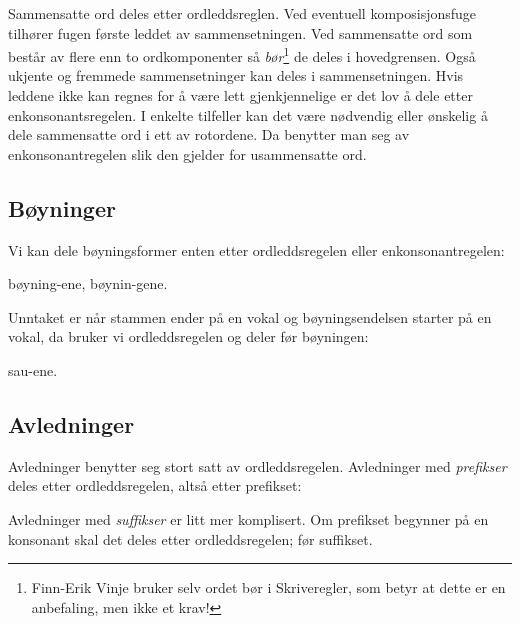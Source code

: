 Sammensatte ord deles etter ordleddsreglen. Ved eventuell komposisjonsfuge tilhører fugen første leddet av sammensetningen. Ved sammensatte ord som består av flere enn to ordkomponenter så \textit{bør}\footnote{Finn-Erik Vinje bruker selv ordet bør i Skriveregler\cite{vinje}, som betyr at dette er en anbefaling, men ikke et krav!} de deles i hovedgrensen. Også ukjente og fremmede sammensetninger kan deles i sammensetningen. Hvis leddene ikke kan regnes for å være lett gjenkjennelige er det lov å dele etter enkonsonantsregelen. I enkelte tilfeller kan det være nødvendig eller ønskelig å dele sammensatte ord i ett av rotordene. Da benytter man seg av enkonsonantregelen slik den gjelder for usammensatte ord.

\newline
{}\newline
{}\newline
{}\newline
{}\newline
{}

\subsection{Bøyninger}

Vi kan dele bøyningsformer enten etter ordleddsregelen eller enkonsonantregelen:

bøyning-ene, bøynin-gene.

Unntaket er når stammen ender på en vokal og bøyningsendelsen starter på en vokal, da bruker vi ordleddsregelen og deler før bøyningen:

sau-ene.

\subsection{Avledninger}

Avledninger benytter seg stort satt av ordleddsregelen. Avledninger med \textit{prefikser} deles etter ordleddsregelen, altså etter prefikset:


Avledninger med \textit{suffikser} er litt mer komplisert. Om prefikset begynner på en konsonant skal det deles etter ordleddsregelen; før suffikset.


